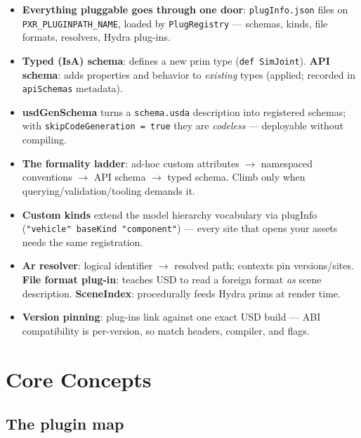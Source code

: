 \CheatSheetTitle
\begin{itemize}[leftmargin=*]
  \item \textbf{Everything pluggable goes through one door}:
        \texttt{plugInfo.json} files on \texttt{PXR\_PLUGINPATH\_NAME},
        loaded by \texttt{PlugRegistry} --- schemas, kinds, file formats,
        resolvers, Hydra plug-ins.
  \item \textbf{Typed (IsA) schema}: defines a new prim type
        (\texttt{def SimJoint}). \textbf{API schema}: adds properties and
        behavior to \emph{existing} types (applied; recorded in
        \texttt{apiSchemas} metadata).
  \item \textbf{usdGenSchema} turns a \texttt{schema.usda} description into
        registered schemas; with \texttt{skipCodeGeneration = true} they are
        \emph{codeless} --- deployable without compiling.
  \item \textbf{The formality ladder}: ad-hoc custom attributes $\to$
        namespaced conventions $\to$ API schema $\to$ typed schema. Climb
        only when querying/validation/tooling demands it.
  \item \textbf{Custom kinds} extend the model hierarchy vocabulary via
        plugInfo (\texttt{"vehicle" baseKind "component"}) --- every site
        that opens your assets needs the same registration.
  \item \textbf{Ar resolver}: logical identifier $\to$ resolved path;
        contexts pin versions/sites. \textbf{File format plug-in}: teaches
        USD to read a foreign format \emph{as} scene description.
        \textbf{SceneIndex}: procedurally feeds Hydra prims at render time.
  \item \textbf{Version pinning}: plug-ins link against one exact USD
        build --- ABI compatibility is per-version, so match headers,
        compiler, and flags.
\end{itemize}

\section{Core Concepts}

\subsection{The plugin map}\label{sec:cu-map}

